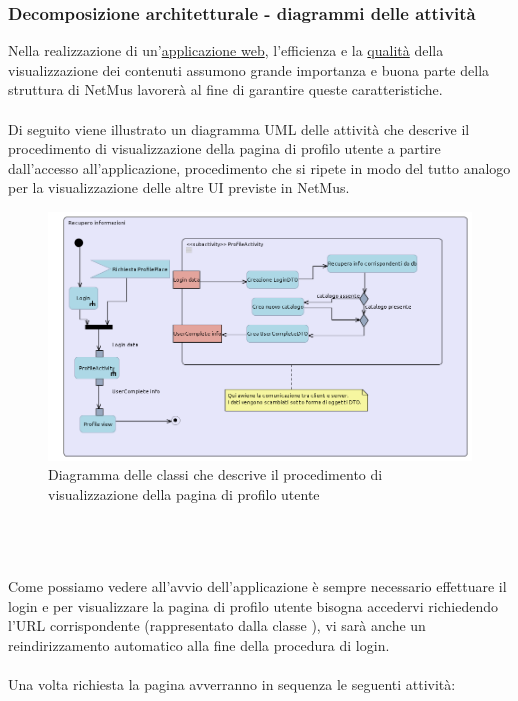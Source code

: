 \subsubsection{Decomposizione architetturale - diagrammi delle attivit\`a}
Nella realizzazione di un'\underline{applicazione web}, l'efficienza e la
\underline{qualit\`a} della visualizzazione dei contenuti assumono grande
importanza e buona parte della struttura di NetMus lavorer\`a
al fine di garantire queste caratteristiche. \\ \\
Di seguito viene illustrato un diagramma UML delle attivit\`a che descrive il
procedimento di visualizzazione della pagina di profilo utente a partire
dall'accesso all'applicazione, procedimento che si ripete in modo del tutto
analogo per la visualizzazione delle altre UI previste in NetMus.
\begin{figure}[h]
  \centering
  \includegraphics[width=16.5cm]{img/ST/profile.png}
\caption{Diagramma delle classi che descrive il procedimento di
visualizzazione della pagina di profilo utente}
\end{figure}
\\\\\\Come possiamo vedere all'avvio dell'applicazione \`e sempre necessario
effettuare il login e per visualizzare la pagina di profilo utente bisogna accedervi
richiedendo l'URL corrispondente (rappresentato dalla classe ),
vi sar\`a anche un reindirizzamento automatico alla fine della procedura di
login.\\  \\
Una volta richiesta la pagina avverranno in sequenza le seguenti attivit\`a:
